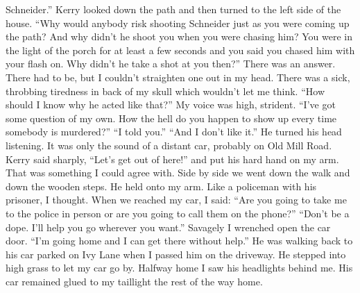 \documentclass{novel}
\begin{document}
Schneider.” Kerry looked down the path and then turned to the left side of the house. “Why would anybody risk shooting Schneider just as you were coming up the path? And why didn’t he shoot you when you were chasing him? You were in the light of the porch for at least a few seconds and you said you chased him with your flash on. Why didn’t he take a shot at you then?” There was an answer. There had to be, but I couldn’t straighten one out in my head. There was a sick, throbbing tiredness in back of my skull which wouldn’t let me think. “How should I know why he acted like that?” My voice was high, strident. “I’ve got some question of my own. How the hell do you happen to show up every time somebody is murdered?” “I told you.” “And I don’t like it.” He turned his head listening. It was only the sound of a distant car, probably on Old Mill Road. Kerry said sharply, “Let’s get out of here!” and put his hard hand on my arm. That was something I could agree with. Side by side we went down the walk and down the wooden steps. He held onto my arm. Like a policeman with his prisoner, I thought. When we reached my car, I said: “Are you going to take me to the police in person or are you going to call them on the phone?” “Don’t be a dope. I’ll help you go wherever you want.” Savagely I wrenched open the car door. “I’m going home and I can get there without help.” He was walking back to his car parked on Ivy Lane when I passed him on the driveway. He stepped into high grass to let my car go by. Halfway home I saw his headlights behind me. His car remained glued to my taillight the rest of the way home.


\begin{ChapterStart}

\vspace{3\nbs}
\end{ChapterStart}

\end{document}
